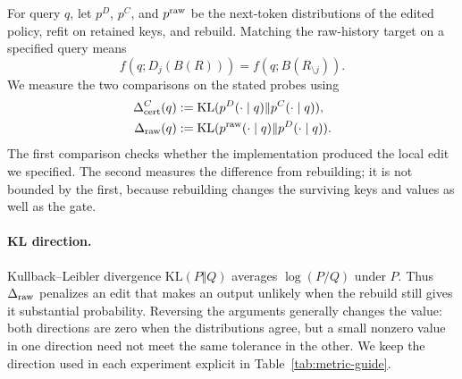 For query \(q\), let \(p^D\), \(p^C\), and \(p^{\rm raw}\) be the
next-token distributions of the edited policy, refit on retained keys, and rebuild.
Matching the raw-history target on a specified query means
\begin{equation}
f(q;D_j(B(R)))=f(q;B(R_{\setminus j})).
\label{eq:raw-output-target}
\end{equation}
We measure the two comparisons on the stated probes using
\begin{align}
\Delta_{\rm cert}^{C}(q)
&:=\mathrm{KL}(p^D(\cdot\mid q)\Vert p^C(\cdot\mid q)),\\
\Delta_{\rm raw}(q)
&:=\mathrm{KL}(p^{\rm raw}(\cdot\mid q)\Vert p^D(\cdot\mid q)).
\end{align}
The first comparison checks whether the implementation produced the local
edit we specified. The second measures the difference from rebuilding; it
is not bounded by the first, because rebuilding changes the surviving keys
and values as well as the gate.

\paragraph{KL direction.}
Kullback--Leibler divergence \(\mathrm{KL}(P\Vert Q)\) averages
\(\log(P/Q)\) under \(P\). Thus \(\Delta_{\rm raw}\) penalizes an edit
that makes an output unlikely when the rebuild still gives it substantial
probability. Reversing the arguments generally changes the value: both
directions are zero when the distributions agree, but a small nonzero value
in one direction need not meet the same tolerance in the other. We keep the
direction used in each experiment explicit in Table~\ref{tab:metric-guide}.

